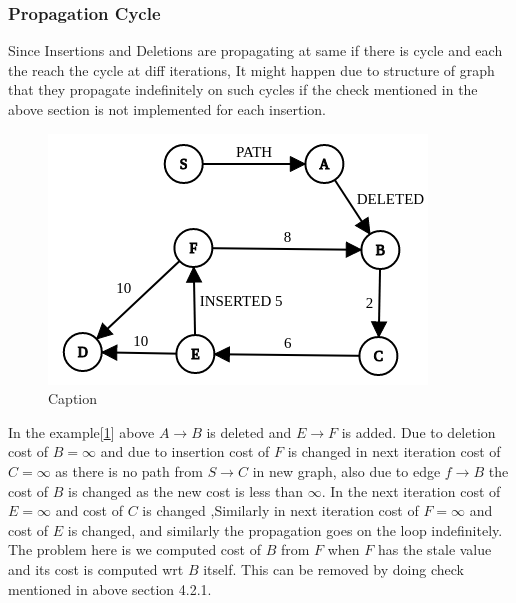 \documentclass[a4paper]{article}
\begin{document}
\subsubsection{Propagation Cycle}
Since Insertions and Deletions are propagating at same if there is cycle and each the reach the cycle at diff iterations, It might happen due to structure of graph that they propagate indefinitely on such cycles if the check mentioned in the above section is not implemented for each insertion.
\begin{figure}[H]
    \centering
    \includegraphics[scale=0.45]{img/prop_cycle.png}
    \caption{Caption}
    \label{fig:propogation_cycle}
\end{figure}

In the example[\ref{fig:propogation_cycle}] above $A \rightarrow B$ is deleted and $E \rightarrow F$ is added. Due to deletion cost of $B = \infty$  and due to insertion cost of $F$ is changed in next iteration cost of $C = \infty$ as there is no path from $S \rightarrow C$ in new graph, also due to edge $f \rightarrow B$ the cost of $B$ is changed as the new cost is less than $\infty$. In the next iteration cost of $E = \infty$ and cost of $C$ is changed ,Similarly in next iteration cost of $F = \infty$ and cost of $E$ is changed, and similarly the propagation goes on the loop indefinitely. The problem here is we computed cost of $B$ from $F$ when $F$ has the stale value and its cost is computed wrt $B$ itself. This can be removed by doing check mentioned in above section 4.2.1. 
\end{document}
